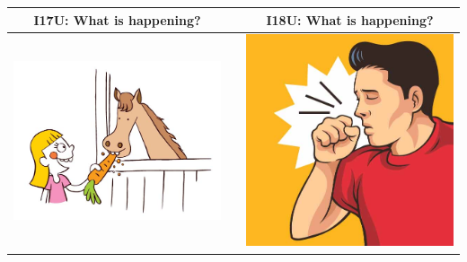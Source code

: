 \documentclass[12pt,notitlepage]{article}
\begin{document}
\begin{center}
\begin{tabular}{|c|c|c|}
\hline
I17U: What is happening? && I18U: What is happening? \\
\hline
\includegraphics[width=20em,trim=0 0 0 -3]{figures/I17.jpg} & & \includegraphics[width=20em,trim=0 0 0 -3]{figures/I18.jpg} \\
\hline
\end{tabular}
\vspace{1em} \\



\end{center}
\end{document}
